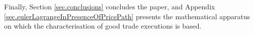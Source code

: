 \documentclass[10pt,a4paper]{article}
\begin{document}
	Finally, Section \ref{sec.conclusions} concludes the paper, and  Appendix \ref{sec.eulerLagrangeInPresenceOfPricePath} presents the mathematical apparatus on which the characterisation of good trade executions is based. 
	
	
	
	
	
%	
%	
%	
%	
%	
%	
\end{document}

